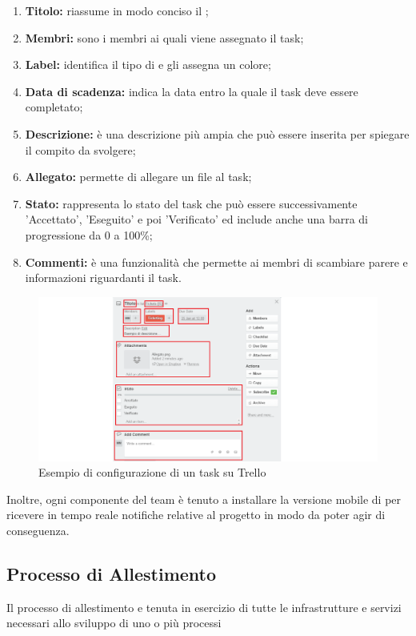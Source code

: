 \documentclass[a4paper,11pt]{article}
\begin{document}
	
		\begin{enumerate}
		\item \textbf{Titolo:} riassume in modo conciso il ;
		\item \textbf{Membri:} sono i membri ai quali viene assegnato il task;
		\item \textbf{Label:} identifica il tipo di  e gli assegna un colore;
		\item \textbf{Data di scadenza:} indica la data entro la quale il task deve essere completato;
		\item \textbf{Descrizione:} è una descrizione più ampia che può essere inserita per spiegare il compito da svolgere;
		\item \textbf{Allegato:} permette di allegare un file al task;
		\item \textbf{Stato:} rappresenta lo stato del task che può essere successivamente 'Accettato', 'Eseguito' e poi 'Verificato' ed include anche una barra di progressione da 0 a 100\%; 
		\item \textbf{Commenti:} è una funzionalità che permette ai membri di scambiare parere e informazioni riguardanti il task.
		
	
		\end{enumerate}
		\begin{figure}[htbp]
		\centering
		\includegraphics[scale=0.50]{../images/tuto2.png}
		\caption{Esempio di configurazione di un task su Trello}			
			
		\end{figure}
			Inoltre, ogni componente del team è tenuto a installare la versione mobile di  per ricevere in tempo reale notifiche relative al progetto in modo da poter agir di conseguenza.


	
		\subsection{Processo di Allestimento}
		Il processo di allestimento e tenuta in esercizio di tutte le
infrastrutture e servizi necessari allo sviluppo di uno o più
processi
\end{document}
